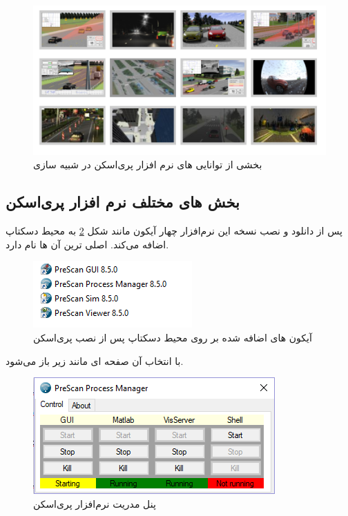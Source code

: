 \begin{figure}
	\centering
	\includegraphics[width=0.8\linewidth]{Figures/Prescan-gallery}
	\caption{بخشی از توانایی های نرم افزار پری‌اسکن در شبیه سازی}
	\label{fig:prescan-gallery}
\end{figure}





\subsection{بخش های مختلف نرم افزار پری‌اسکن}
پس از دانلود و نصب نسخه  این نرم‌افزار چهار آیکون مانند شکل 
\ref{fig:prescan-icons}
به محیط دسکتاپ اضافه می‌کند.  اصلی ترین آن ها 
نام دارد.

\begin{figure}[h]
	\centering
	\includegraphics[width=0.4\linewidth]{Figures/prescan-icons}
	\caption{آیکون های اضافه شده بر روی محیط دسکتاپ پس از نصب پری‌اسکن}
	\label{fig:prescan-icons}
\end{figure}
 
 با انتخاب آن صفحه ای مانند زیر باز می‌شود.

\begin{figure}[h]
	\centering
	\includegraphics[width=0.5\linewidth]{Figures/Prescan-panel}
	\caption{پنل مدریت نرم‌افزار پری‌اسکن}
	\label{fig:prescan-panel}
\end{figure}

